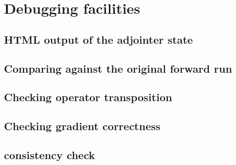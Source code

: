 \chapter{Debugging facilities}

\begin{synopsis}
\end{synopsis}
\minitoc
\vspace{\fill}
\newpage

\section{HTML output of the adjointer state}
\section{Comparing against the original forward run}
\section{Checking operator transposition}
\section{Checking gradient correctness}
\section{\adjointer consistency check}

